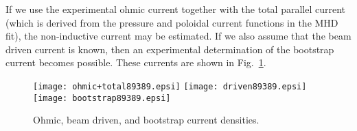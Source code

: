 If we use the experimental ohmic current together with the total parallel
current (which is derived from the pressure and poloidal current functions in
the MHD fit),  the non-inductive current may be  estimated. If we also assume
that the beam driven current is known, then an experimental determination of 
the bootstrap current becomes possible.  These currents are shown in
Fig.~\ref{TDEMboot}. 
\begin{figure}
 \centering
 \texttt{[image: ohmic+total89389.epsi]}
 \texttt{[image: driven89389.epsi]}
 \texttt{[image: bootstrap89389.epsi]}
 \caption{Ohmic, beam driven, and bootstrap current densities.\label{TDEMboot}}
\end{figure}
